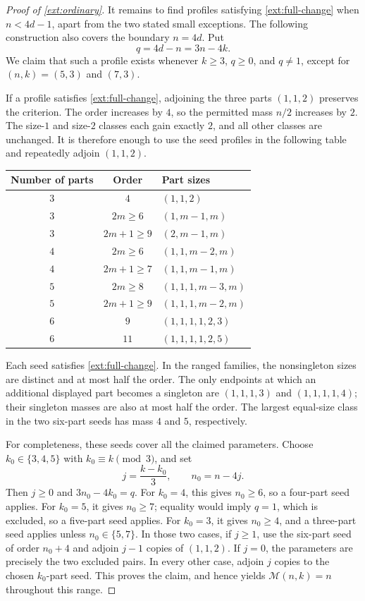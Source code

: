 \documentclass[11pt,reqno]{amsart}
\numberwithin{equation}{section}
\theoremstyle{definition}
\theoremstyle{remark}
\begin{document}
\begin{proof}[Proof of \cref{ext:ordinary}]
It remains to find profiles satisfying \eqref{ext:full-change} when
$n<4d-1$, apart from the two stated small exceptions.  The following
construction also covers the boundary $n=4d$.  Put
\[
 q=4d-n=3n-4k.
\]
We claim that such a profile exists whenever $k\ge3$, $q\ge0$, and
$q\ne1$, except for $(n,k)=(5,3)$ and $(7,3)$.

If a profile satisfies \eqref{ext:full-change}, adjoining the three
parts $(1,1,2)$ preserves the criterion.  The order increases by $4$,
so the permitted mass $n/2$ increases by $2$.  The size-$1$ and
size-$2$ classes each gain exactly $2$, and all other classes are
unchanged.  It is therefore enough to use the seed profiles in the
following table and repeatedly adjoin $(1,1,2)$.
\begin{center}
\begin{tabular}{ccl}
Number of parts & Order & Part sizes\\
\hline
$3$ & $4$ & $(1,1,2)$\\
$3$ & $2m\ge6$ & $(1,m-1,m)$\\
$3$ & $2m+1\ge9$ & $(2,m-1,m)$\\
$4$ & $2m\ge6$ & $(1,1,m-2,m)$\\
$4$ & $2m+1\ge7$ & $(1,1,m-1,m)$\\
$5$ & $2m\ge8$ & $(1,1,1,m-3,m)$\\
$5$ & $2m+1\ge9$ & $(1,1,1,m-2,m)$\\
$6$ & $9$ & $(1,1,1,1,2,3)$\\
$6$ & $11$ & $(1,1,1,1,2,5)$
\end{tabular}
\end{center}
Each seed satisfies \eqref{ext:full-change}.  In the ranged families,
the nonsingleton sizes are distinct and at most half the order.  The
only endpoints at which an additional displayed part becomes a
singleton are $(1,1,1,3)$ and $(1,1,1,1,4)$; their singleton masses
are also at most half the order.  The largest equal-size class in the
two six-part seeds has mass $4$ and $5$, respectively.

For completeness, these seeds cover all the claimed parameters.
Choose $k_0\in\{3,4,5\}$ with $k_0\equiv k\pmod3$, and set
\[
 j=\frac{k-k_0}{3},\qquad n_0=n-4j.
\]
Then $j\ge0$ and $3n_0-4k_0=q$.  For $k_0=4$, this gives
$n_0\ge6$, so a four-part seed applies.  For $k_0=5$, it gives
$n_0\ge7$; equality would imply $q=1$, which is excluded, so a
five-part seed applies.  For $k_0=3$, it gives $n_0\ge4$, and a
three-part seed applies unless $n_0\in\{5,7\}$.  In those two cases,
if $j\ge1$, use the six-part seed of order $n_0+4$ and adjoin
$j-1$ copies of $(1,1,2)$.  If $j=0$, the parameters are precisely
the two excluded pairs.  In every other case, adjoin $j$ copies to
the chosen $k_0$-part seed.  This proves the claim, and hence yields
$\mathcal M(n,k)=n$ throughout this range.


\end{proof}
\end{document}
